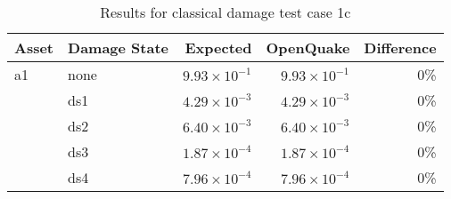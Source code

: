 \begin{table}[htbp]

\centering
\begin{tabular}{ l l r r r }

\hline
\rowcolor{anti-flashwhite}
\bf{Asset} & \bf{Damage State} & \bf{Expected} & \bf{OpenQuake} & \bf{Difference}\\
\hline
a1 & none & $9.93 \times 10^{-1}$ & $9.93 \times 10^{-1}$ & 0\% \\
   & ds1 & $4.29 \times 10^{-3}$ & $4.29 \times 10^{-3}$ & 0\% \\
   & ds2 & $6.40 \times 10^{-3}$ & $6.40 \times 10^{-3}$ & 0\% \\
   & ds3 & $1.87 \times 10^{-4}$ & $1.87 \times 10^{-4}$ & 0\% \\
   & ds4 & $7.96 \times 10^{-4}$ & $7.96 \times 10^{-4}$ & 0\% \\
\hline
\end{tabular}

\caption{Results for classical damage test case 1c}
\label{tab:result-cd-1c}
\end{table}